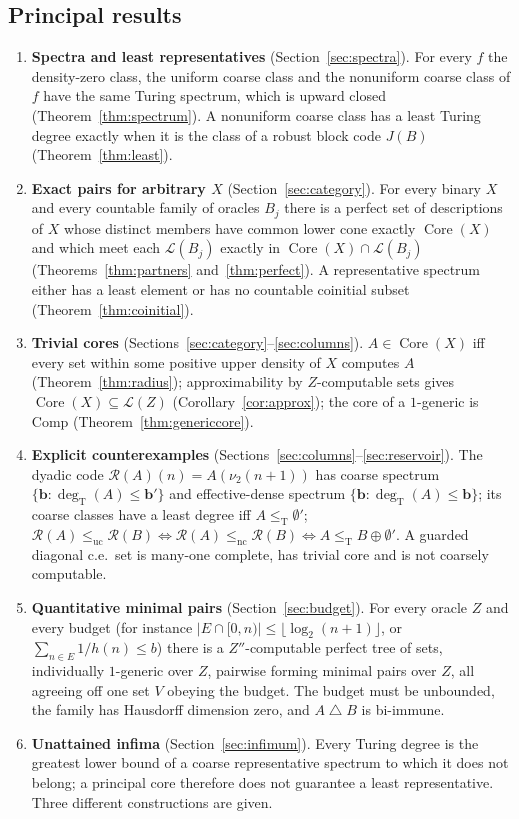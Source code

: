 \documentclass[11pt,letterpaper]{article}
\theoremstyle{definition}
\numberwithin{equation}{section}
\newcommand{\leT}{\le_{\mathrm T}}
\newcommand{\lenc}{\le_{\mathrm{nc}}}
\newcommand{\leuc}{\le_{\mathrm{uc}}}
\newcommand{\Low}{\mathcal L}
\newcommand{\Core}{\operatorname{Core}}
\newcommand{\Comp}{\mathrm{Comp}}
\newcommand{\degT}{\deg_{\mathrm T}}
\newcommand{\J}{J}
\newcommand{\Rc}{\mathcal R}
\newcommand{\sd}{\mathbin{\triangle}}
\begin{document}
\subsection{Principal results}
\begin{enumerate}[label=\textbf{\Alph*.}]
\item \textbf{Spectra and least representatives} (Section~\ref{sec:spectra}). For every $f$ the density-zero class, the uniform coarse class and the nonuniform coarse class of $f$ have the same Turing spectrum, which is upward closed (Theorem~\ref{thm:spectrum}). A nonuniform coarse class has a least Turing degree exactly when it is the class of a robust block code $\J(B)$ (Theorem~\ref{thm:least}).
\item \textbf{Exact pairs for arbitrary $X$} (Section~\ref{sec:category}). For every binary $X$ and every countable family of oracles $B_j$ there is a perfect set of descriptions of $X$ whose distinct members have common lower cone exactly $\Core(X)$ and which meet each $\Low(B_j)$ exactly in $\Core(X)\cap\Low(B_j)$ (Theorems~\ref{thm:partners} and~\ref{thm:perfect}). A representative spectrum either has a least element or has no countable coinitial subset (Theorem~\ref{thm:coinitial}).
\item \textbf{Trivial cores} (Sections~\ref{sec:category}--\ref{sec:columns}). $A\in\Core(X)$ iff every set within some positive upper density of $X$ computes $A$ (Theorem~\ref{thm:radius}); approximability by $Z$-computable sets gives $\Core(X)\subseteq\Low(Z)$ (Corollary~\ref{cor:approx}); the core of a $1$-generic is $\Comp$ (Theorem~\ref{thm:genericcore}).
\item \textbf{Explicit counterexamples} (Sections~\ref{sec:columns}--\ref{sec:reservoir}). The dyadic code $\Rc(A)(n)=A(\nu_2(n+1))$ has coarse spectrum $\{\mathbf b:\degT(A)\le\mathbf b'\}$ and effective-dense spectrum $\{\mathbf b:\degT(A)\le\mathbf b\}$; its coarse classes have a least degree iff $A\leT\emptyset'$; $\Rc(A)\leuc\Rc(B)\iff\Rc(A)\lenc\Rc(B)\iff A\leT B\oplus\emptyset'$. A guarded diagonal c.e.\ set is many-one complete, has trivial core and is not coarsely computable.
\item \textbf{Quantitative minimal pairs} (Section~\ref{sec:budget}). For every oracle $Z$ and every budget (for instance $|E\cap[0,n)|\le\lfloor\log_2(n+1)\rfloor$, or $\sum_{n\in E}1/h(n)\le b$) there is a $Z''$-computable perfect tree of sets, individually $1$-generic over $Z$, pairwise forming minimal pairs over $Z$, all agreeing off one set $V$ obeying the budget. The budget must be unbounded, the family has Hausdorff dimension zero, and $A\sd B$ is bi-immune.
\item \textbf{Unattained infima} (Section~\ref{sec:infimum}). Every Turing degree is the greatest lower bound of a coarse representative spectrum to which it does not belong; a principal core therefore does not guarantee a least representative. Three different constructions are given.
\end{enumerate}
\end{document}
